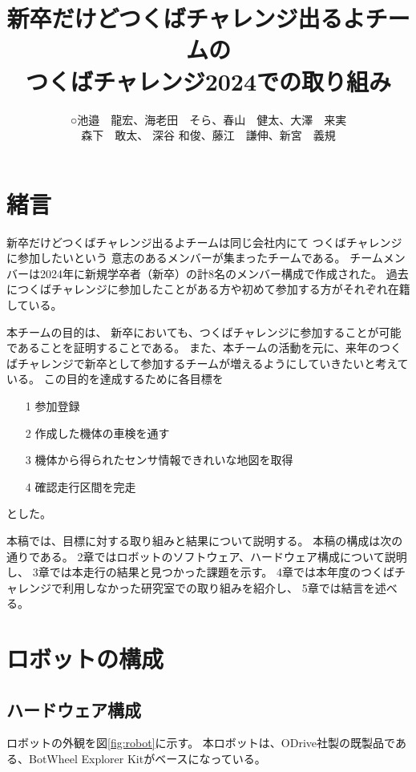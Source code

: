 \documentclass[twocolumn,9pt]{jsproceedings}
\title{新卒だけどつくばチャレンジ出るよチームの\\つくばチャレンジ2024での取り組み}
\author{○池邉　龍宏\authorrefmark{1}、海老田　そら\authorrefmark{1}、春山　健太\authorrefmark{1}、大澤　来実\authorrefmark{1}\\森下　敢太\authorrefmark{1}、
深谷 和俊\authorrefmark{1}、藤江　謙伸\authorrefmark{1}、新宮　義規\authorrefmark{1}}
\affiliation{新卒だけどつくばチャレンジ出るよ}
\begin{document}
\maketitle


\section{緒言}

新卒だけどつくばチャレンジ出るよチームは同じ会社内にて
つくばチャレンジに参加したいという
意志のあるメンバーが集まったチームである。
チームメンバーは2024年に新規学卒者（新卒）の計8名のメンバー構成で作成された。
過去につくばチャレンジに参加したことがある方や初めて参加する方がそれぞれ在籍している。

本チームの目的は、
新卒においても、つくばチャレンジに参加することが可能であることを証明することである。
また、本チームの活動を元に、来年のつくばチャレンジで新卒として参加するチームが増えるようにしていきたいと考えている。
この目的を達成するために各目標を
\begin{itemize}
  \item[1] 参加登録
  \item[2] 作成した機体の車検を通す
  \item[3] 機体から得られたセンサ情報できれいな地図を取得
  \item[4] 確認走行区間を完走
\end{itemize}
とした。


本稿では、目標に対する取り組みと結果について説明する。
本稿の構成は次の通りである。
2章ではロボットのソフトウェア、ハードウェア構成について説明し、
3章では本走行の結果と見つかった課題を示す。
4章では本年度のつくばチャレンジで利用しなかった研究室での取り組みを紹介し、
5章では結言を述べる。

\section{ロボットの構成}

\subsection{ハードウェア構成}
ロボットの外観を図\ref{fig:robot}に示す。
本ロボットは、ODrive社製の既製品である、BotWheel Explorer Kit\cite{RTshop}がベースになっている。
\end{document}
